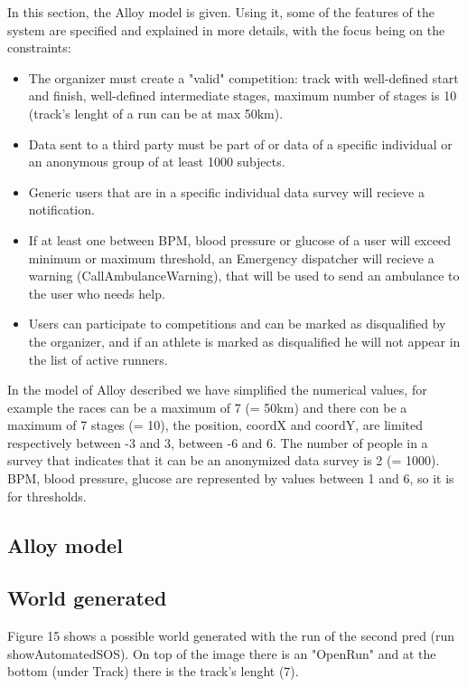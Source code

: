 
%
In this section, the Alloy model is given. Using it, some of the features of the system are specified and explained in more details, with the focus being on the constraints:
\begin{itemize}
\item The organizer must create a "valid" competition: track with well-defined start and finish, well-defined intermediate stages, maximum number of stages is 10 (track's lenght of a run can be at max 50km).
\item Data sent to a third party must be part of or data of a specific individual or an anonymous group of at least 1000 subjects.
\item Generic users that are in a specific individual data survey will recieve a notification.
\item If at least one between BPM, blood pressure or glucose of a user will exceed minimum or maximum threshold, an Emergency dispatcher will recieve a warning (CallAmbulanceWarning), that will be used to send an ambulance to the user who needs help.
\item Users can participate to competitions and can be marked as disqualified by the organizer, and if an athlete is marked as disqualified he will not appear in the list of active runners.
\end{itemize}

In the model of Alloy described we have simplified the numerical values, for example the races can be a maximum of 7 (= 50km) and there con be a maximum of 7 stages (= 10), the position, coordX and coordY, are limited respectively between -3 and 3, between -6 and 6. The number of people in a survey that indicates that it can be an anonymized data survey is 2 (= 1000). BPM, blood pressure, glucose are represented by values between 1 and 6, so it is for thresholds. 
\subsection{Alloy model}

\clearpage
\subsection{World generated}
Figure 15 shows a possible world generated with the run of the second pred (run showAutomatedSOS). On top of the image there is an "OpenRun" and at the bottom (under Track) there is the track's lenght (7).

